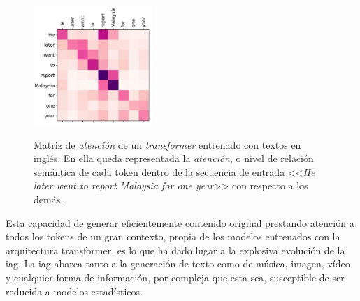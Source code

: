 \begin{figure}[H]
    \caption[Matriz de \emph{atención} de un \emph{transformer} entrenado con textos en inglés]{Matriz de \emph{atención} de un \emph{transformer} entrenado con textos en inglés. En ella queda representada la \emph{atención}, o nivel de relación semántica de cada token dentro de la secuencia de entrada <<\emph{He later went to report Malaysia for one year}>> con respecto a los demás.}
    \centering
    \includegraphics[width=0.4\textwidth]{./figuras/Transformer_attention_matrix.png}
    \label{fig:transformer_attention}
\end{figure}

Esta capacidad de generar eficientemente contenido original prestando atención a todos los tokens de un gran contexto, propia de los modelos entrenados con la arquitectura transformer, es lo que ha dado lugar a la explosiva evolución de la \gls{iag}. La \gls{iag} abarca tanto a la generación de texto como de música, imagen, vídeo y cualquier forma de información, por compleja que esta sea, susceptible de ser reducida a modelos estadísticos.